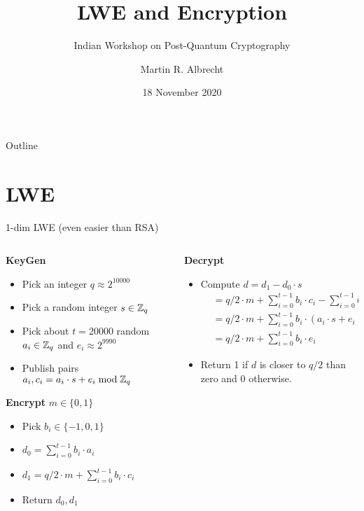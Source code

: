 \documentclass[xcolor=table,10pt,aspectratio=169]{beamer}
\author{Martin R. Albrecht}
\date{18 November 2020}
\title{LWE and Encryption}
\subtitle{Indian Workshop on Post-Quantum Cryptography}
\begin{document}
\maketitle
\begin{frame}{Outline}
\tableofcontents
\end{frame}


\section{LWE}
\label{sec:org3c54f9e}

\begin{frame}[label={sec:orga1297bc}]{1-dim LWE (even easier than RSA)}
\begin{columns}[t]
\begin{column}{0.4\columnwidth}
\textbf{KeyGen}

\begin{itemize}
\item Pick an integer \(q \approx 2^{10000}\)
\item Pick a random integer \(s \in \mathbb{Z}_q\)
\item Pick about \(t=20000\) random \(a_i \in \mathbb{Z}_q\) and \(e_i \approx 2^{9990}\)
\item Publish pairs \(a_i, c_i = a_i \cdot s + e_i \bmod \mathbb{Z}_q\)
\end{itemize}

\textbf{Encrypt}  \(m \in \{0,1\}\)

\begin{itemize}
\item Pick \(b_i \in \{-1,0,1\}\)
\item \(d_0 = \sum_{i=0}^{t-1} b_i \cdot a_i\)
\item \(d_1 = q/2\cdot m + \sum_{i=0}^{t-1} b_i \cdot c_i\)
\item Return \(d_0, d_1\)
\end{itemize}
\end{column}

\begin{column}{0.6\columnwidth}
\textbf{Decrypt}

\begin{itemize}
\item Compute \(d = d_1 - d_0 \cdot s\)
\begin{align*}
  &= q/2\cdot m + \sum_{i=0}^{t-1} b_i \cdot c_i - \sum_{i=0}^{t-1} b_i \cdot a_i \cdot s\\
  &= q/2\cdot m + \sum_{i=0}^{t-1} b_i \cdot (a_i \cdot s + e_i) - \sum_{i=0}^{t-1} b_i \cdot a_i \cdot s\\
  &= q/2\cdot m + \sum_{i=0}^{t-1} b_i \cdot  e_i 
\end{align*}
\item Return 1 if \(d\) is closer to \(q/2\) than zero and 0 otherwise.
\end{itemize}
\end{column}
\end{columns}
\end{frame}
\end{document}
